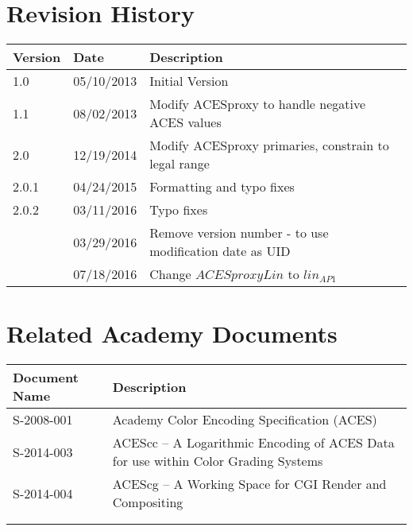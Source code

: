\prelimsectionformat	%
\chapter{Revision History}

\begin{tabularx}{\linewidth}{|l|l|X|}
    \hline
    Version & Date & Description \\ \hline
    1.0     & 05/10/2013 & Initial Version      \\ \hline
    1.1     & 08/02/2013 & Modify ACESproxy to handle negative ACES values \\ \hline
    2.0     & 12/19/2014 & Modify ACESproxy primaries, constrain to legal range \\ \hline
    2.0.1   & 04/24/2015 & Formatting and typo fixes \\ \hline
    2.0.2   & 03/11/2016 & Typo fixes \\ \hline
            & 03/29/2016 & Remove version number - to use modification date as UID \\ \hline
            & 07/18/2016 & Change $ACESproxyLin$ to $lin_{AP1}$\\ \hline
\end{tabularx}

\vspace{0.25in} %
\chapter{Related Academy Documents} %
\begin{tabularx}{\linewidth}{|l|X|}
    \hline
    Document Name & Description \\ \hline
    S-2008-001  & Academy Color Encoding Specification (ACES) \\ \hline
    S-2014-003  & ACEScc -- A Logarithmic Encoding of ACES Data for use within Color Grading Systems \\ \hline
    S-2014-004  & ACEScg -- A Working Space for CGI Render and Compositing \\ \hline
    & \\ \hline
    & \\ \hline
\end{tabularx}